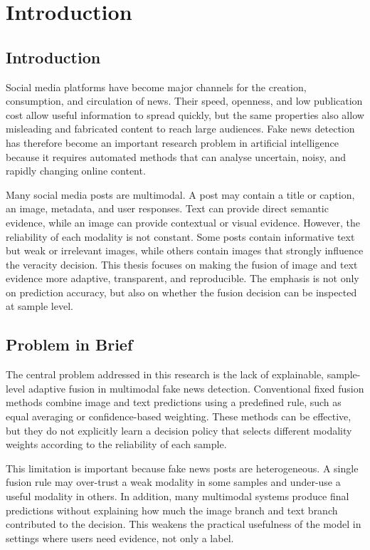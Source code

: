 \chapter{Introduction}


\section{Introduction}


Social media platforms have become major channels for the creation, consumption, and circulation of news. Their speed, openness, and low publication cost allow useful information to spread quickly, but the same properties also allow misleading and fabricated content to reach large audiences. Fake news detection has therefore become an important research problem in artificial intelligence because it requires automated methods that can analyse uncertain, noisy, and rapidly changing online content.


Many social media posts are multimodal. A post may contain a title or caption, an image, metadata, and user responses. Text can provide direct semantic evidence, while an image can provide contextual or visual evidence. However, the reliability of each modality is not constant. Some posts contain informative text but weak or irrelevant images, while others contain images that strongly influence the veracity decision. This thesis focuses on making the fusion of image and text evidence more adaptive, transparent, and reproducible. The emphasis is not only on prediction accuracy, but also on whether the fusion decision can be inspected at sample level.


\section{Problem in Brief}


The central problem addressed in this research is the lack of explainable, sample-level adaptive fusion in multimodal fake news detection. Conventional fixed fusion methods combine image and text predictions using a predefined rule, such as equal averaging or confidence-based weighting. These methods can be effective, but they do not explicitly learn a decision policy that selects different modality weights according to the reliability of each sample.


This limitation is important because fake news posts are heterogeneous. A single fusion rule may over-trust a weak modality in some samples and under-use a useful modality in others. In addition, many multimodal systems produce final predictions without explaining how much the image branch and text branch contributed to the decision. This weakens the practical usefulness of the model in settings where users need evidence, not only a label.


